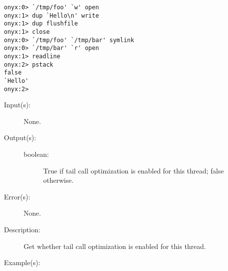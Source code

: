 \begin{description}
\begin{description}
\begin{verbatim}
onyx:0> `/tmp/foo' `w' open
onyx:1> dup `Hello\n' write
onyx:1> dup flushfile
onyx:1> close
onyx:0> `/tmp/foo' `/tmp/bar' symlink
onyx:0> `/tmp/bar' `r' open
onyx:1> readline
onyx:2> pstack
false
`Hello'
onyx:2>
		\end{verbatim}
	\end{description}
\label{systemdict:tailopt}
\item[{\onyxop{--}{tailopt}{boolean}}: ]
	\begin{description}\item[]
	\item[Input(s): ] None.
	\item[Output(s): ]
		\begin{description}\item[]
		\item[boolean: ]
			True if tail call optimization is enabled for this
			thread; false otherwise.
		\end{description}
	\item[Error(s): ] None.
	\item[Description: ]
		Get whether tail call optimization is enabled for this thread.
	\item[Example(s): ]\begin{verbatim}


\end{verbatim}
\end{description}
\end{description}
